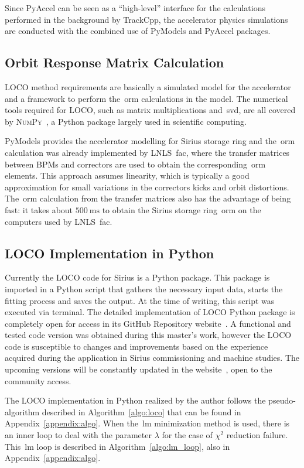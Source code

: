 Since PyAccel can be seen as a ``high-level'' interface for the calculations performed in the background by TrackCpp, the accelerator physics simulations are conducted with the combined use of PyModels and PyAccel packages.

\subsection{Orbit Response Matrix Calculation}
LOCO method requirements are basically a simulated model for the accelerator and a framework to perform the~\gls{orm} calculations in the model. The numerical tools required for LOCO, such as matrix multiplications and~\gls{svd}, are all covered by \textsc{NumPy}~\cite{numpy}, a Python package largely used in scientific computing. 

PyModels provides the accelerator modelling for Sirius storage ring and the~\gls{orm} calculation was already implemented by LNLS~\gls{fac}, where the transfer matrices between BPMs and correctors are used to obtain the corresponding~\gls{orm} elements. This approach assumes linearity, which is typically a good approximation for small variations in the correctors kicks and orbit distortions. The~\gls{orm} calculation from the transfer matrices also has the advantage of being fast: it takes about $\SI{500}{\milli\second}$ to obtain the Sirius storage ring~\gls{orm} on the computers used by LNLS~\gls{fac}.

\subsection{LOCO Implementation in Python}
Currently the LOCO code for Sirius is a Python package. This package is imported in a Python script that gathers the necessary input data, starts the fitting process and saves the output. At the time of writing, this script was executed via terminal. The detailed implementation of LOCO Python package is completely open for access in its GitHub Repository website~\cite{locosirius}. A functional and tested code version was obtained during this master's work, however the LOCO code is susceptible to changes and improvements based on the experience acquired during the application in Sirius commissioning and machine studies. The upcoming versions will be constantly updated in the website~\cite{locosirius}, open to the community access.

The LOCO implementation in Python realized by the author follows the pseudo-algorithm described in Algorithm~\ref{algo:loco} that can be found in Appendix~\ref{appendix:algo}. When the~\gls{lm} minimization method is used, there is an inner loop to deal with the parameter $\lambda$ for the case of $\chi^2$ reduction failure. This~\gls{lm} loop is described in Algorithm~\ref{algo:lm_loop}, also in Appendix~\ref{appendix:algo}.

